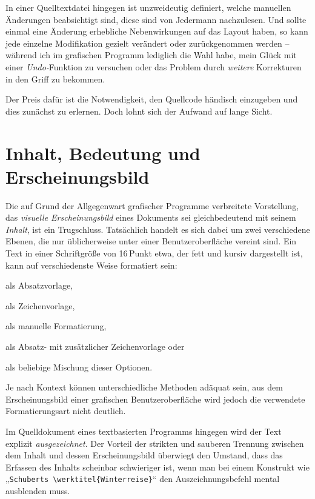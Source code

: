 \documentclass[DIV=12]{scrreprt}
\begin{document}
In einer Quelltextdatei hingegen ist unzweideutig definiert, welche manuellen Änderungen beabsichtigt sind, diese sind von Jedermann nachzulesen.
Und sollte einmal eine Änderung erhebliche Nebenwirkungen auf das Layout haben, so kann jede einzelne Modifikation gezielt verändert oder zurückgenommen werden -- während ich im grafischen Programm lediglich die Wahl habe, mein Glück mit einer \emph{Undo-}Funktion zu versuchen oder das Problem durch \emph{weitere} Korrekturen in den Griff zu bekommen.

Der Preis dafür ist die Notwendigkeit, den Quellcode händisch einzugeben und dies zunächst zu erlernen.
Doch lohnt sich der Aufwand auf lange Sicht.

\section*{Inhalt, Bedeutung und Erscheinungsbild}
\label{sec:pt_separation-content-meaning-appearance}
Die auf Grund der Allgegenwart grafischer Programme verbreitete Vorstellung, das \emph{visuelle Erscheinungsbild} eines Dokuments sei gleichbedeutend mit seinem \emph{Inhalt}, ist ein Trugschluss.
Tatsächlich handelt es sich dabei um zwei verschiedene Ebenen, die nur üblicherweise unter einer Benutzeroberfläche vereint sind.
Ein Text in einer Schriftgröße von 16\,Punkt etwa, der fett und kursiv dargestellt ist, kann auf verschiedenste Weise formatiert sein:
\begin{inparaenum}[1)]
\item als Absatzvorlage,
\item als Zeichenvorlage,
\item als manuelle Formatierung,
\item als Absatz- mit zusätzlicher Zeichenvorlage oder
\item als beliebige Mischung dieser Optionen.
\end{inparaenum}
Je nach Kontext können unterschiedliche Methoden adäquat sein, aus dem Erscheinungsbild einer grafischen Benutzeroberfläche wird jedoch die verwendete Formatierungsart nicht deutlich.

Im Quelldokument eines textbasierten Programms hingegen wird der Text explizit \emph{ausgezeichnet}.
Der Vorteil der strikten und sauberen Trennung zwischen dem Inhalt und dessen Erscheinungsbild überwiegt den Umstand, dass das Erfassen des Inhalts scheinbar schwieriger ist, wenn man bei einem Konstrukt wie „\texttt{Schuberts \textbackslash werktitel\{Winterreise\}}“ den Auszeichnungsbefehl mental ausblenden muss.
\end{document}
